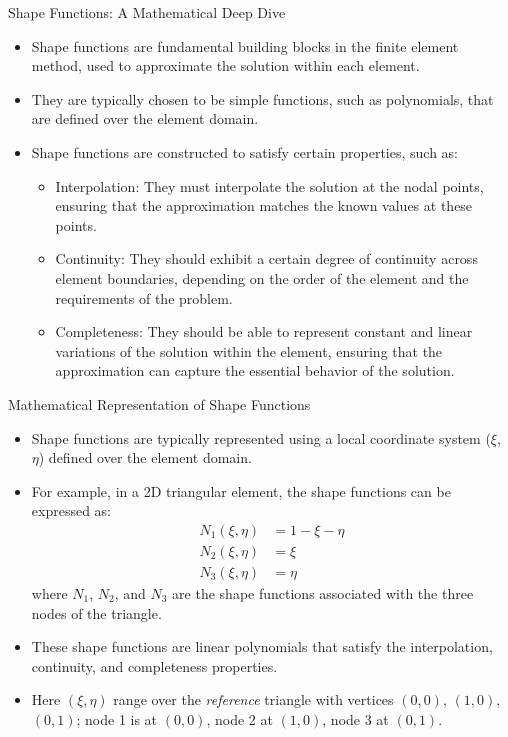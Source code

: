 \documentclass[aspectratio=169,11pt]{beamer}
\begin{document}
\begin{frame}{Shape Functions: A Mathematical Deep Dive}
    \begin{itemize}
        \item Shape functions are fundamental building blocks in the finite element method, used to approximate the solution within each element.
        \item They are typically chosen to be simple functions, such as polynomials, that are defined over the element domain.
        \item Shape functions are constructed to satisfy certain properties, such as:
        \begin{itemize}
            \item Interpolation: They must interpolate the solution at the nodal points, ensuring that the approximation matches the known values at these points.
            \item Continuity: They should exhibit a certain degree of continuity across element boundaries, depending on the order of the element and the requirements of the problem.
            \item Completeness: They should be able to represent constant and linear variations of the solution within the element, ensuring that the approximation can capture the essential behavior of the solution.
        \end{itemize}
    \end{itemize}
\end{frame}

\begin{frame}{Mathematical Representation of Shape Functions}
    \begin{itemize}
        \item Shape functions are typically represented using a local coordinate system ($\xi$, $\eta$) defined over the element domain.
        \item For example, in a 2D triangular element, the shape functions can be expressed as:
        \begin{align*}
        N_1(\xi, \eta) &= 1 - \xi - \eta \\
        N_2(\xi, \eta) &= \xi \\
        N_3(\xi, \eta) &= \eta
        \end{align*}
        where $N_1$, $N_2$, and $N_3$ are the shape functions associated with the three nodes of the triangle.
        \item These shape functions are linear polynomials that satisfy the interpolation, continuity, and completeness properties.
        \item Here $(\xi,\eta)$ range over the \emph{reference} triangle with vertices $(0,0)$, $(1,0)$, $(0,1)$; node 1 is at $(0,0)$, node 2 at $(1,0)$, node 3 at $(0,1)$.
    \end{itemize}
\end{frame}
\end{document}

